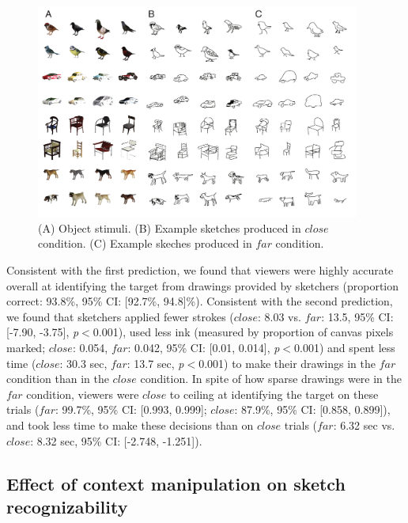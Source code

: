 \documentclass[9pt,twocolumn,twoside]{pnas-new}
\begin{document}
\begin{figure}[htbp]
\centering
\includegraphics[width=0.95\textwidth]{figures/2_sketch_gallery.pdf}
\caption{(A) Object stimuli. (B) Example sketches produced in $close$ condition. (C) Example skeches produced in $far$ condition.}
\label{sketch_gallery}
\end{figure}

Consistent with the first prediction, we found that viewers were highly accurate overall at identifying the target from drawings provided by sketchers (proportion correct: 93.8\%, 95\% CI: [92.7\%, 94.8]\%). Consistent with the second prediction, we found that sketchers applied fewer strokes ($close$: 8.03 vs. $far$: 13.5, 95\% CI: [-7.90, -3.75], \textit{p}$<$0.001), used less ink (measured by proportion of canvas pixels marked; $close$: 0.054, $far$: 0.042, 95\% CI: [0.01, 0.014], \textit{p}$<$0.001) and spent less time ($close$: 30.3 sec, $far$: 13.7 sec, \textit{p}$<$0.001) to make their drawings in the $far$ condition than in the $close$ condition. In spite of how sparse drawings were in the $far$ condition, viewers were $close$ to ceiling at identifying the target on these trials ($far$: 99.7\%, 95\% CI: [0.993, 0.999]; $close$: 87.9\%, 95\% CI: [0.858, 0.899]), and took less time to make these decisions than on $close$ trials ($far$: 6.32 sec vs. $close$: 8.32 sec, 95\% CI: [-2.748, -1.251]).

\subsection*{Effect of context manipulation on sketch recognizability}
\end{document}
